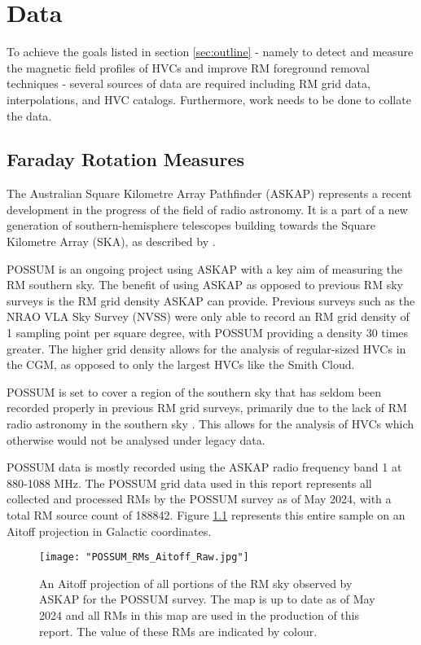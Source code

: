 \chapter{Data}
\label{cha:data}

To achieve the goals listed in section \ref{sec:outline} - namely to detect and measure the magnetic field profiles of HVCs and improve RM foreground removal techniques - several sources of data are required including RM grid data, interpolations, and HVC catalogs. Furthermore, work needs to be done to collate the data.

\section{Faraday Rotation Measures}
\label{sec:ASKAP}

The Australian Square Kilometre Array Pathfinder (ASKAP) represents a recent development in the progress of the field of radio astronomy. It is a part of a new generation of southern-hemisphere telescopes building towards the Square Kilometre Array (SKA), as described by \cite{ID61, ID52, ID71}.


POSSUM is an ongoing project using ASKAP with a key aim of measuring the RM southern sky. The benefit of using ASKAP as opposed to previous RM sky surveys is the RM grid density ASKAP can provide. Previous surveys such as the NRAO VLA Sky Survey (NVSS) were only able to record an RM grid density of 1 sampling point per square degree, with POSSUM providing a density 30 times greater. The higher grid density allows for the analysis of regular-sized HVCs in the CGM, as opposed to only the largest HVCs like the Smith Cloud.


POSSUM is set to cover a region of the southern sky that has seldom been recorded properly in previous RM grid surveys, primarily due to the lack of RM radio astronomy in the southern sky \citep{ID44, ID45, ID52, ID71}. This allows for the analysis of HVCs which otherwise would not be analysed under legacy data.


POSSUM data is mostly recorded using the ASKAP radio frequency band 1 at 880-1088 MHz. The POSSUM grid data used in this report represents all collected and processed RMs by the POSSUM survey as of May 2024, with a total RM source count of 188842. Figure \ref{fig:rm_map} represents this entire sample on an Aitoff projection in Galactic coordinates.

\begin{figure}
    \texttt{[image: "POSSUM\_RMs\_Aitoff\_Raw.jpg"]}
    \centering
    \caption{An Aitoff projection of all portions of the RM sky observed by ASKAP for the POSSUM survey. The map is up to date as of May 2024 and all RMs in this map are used in the production of this report. The value of these RMs are indicated by colour.}
    \label{fig:rm_map}
\end{figure}


